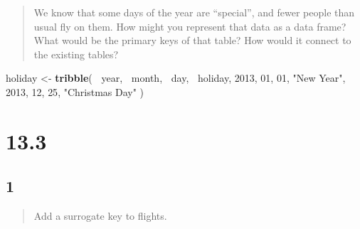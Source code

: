 \documentclass[]{ltjsarticle}
\newenvironment{Shaded}{\begin{snugshade}}{\end{snugshade}}
\newcommand{\DataTypeTok}[1]{\textcolor[rgb]{0.13,0.29,0.53}{#1}}
\newcommand{\DecValTok}[1]{\textcolor[rgb]{0.00,0.00,0.81}{#1}}
\newcommand{\KeywordTok}[1]{\textcolor[rgb]{0.13,0.29,0.53}{\textbf{#1}}}
\newcommand{\NormalTok}[1]{#1}
\newcommand{\OperatorTok}[1]{\textcolor[rgb]{0.81,0.36,0.00}{\textbf{#1}}}
\newcommand{\StringTok}[1]{\textcolor[rgb]{0.31,0.60,0.02}{#1}}
\begin{document}
\begin{quote}
We know that some days of the year are ``special'', and fewer people
than usual fly on them. How might you represent that data as a data
frame? What would be the primary keys of that table? How would it
connect to the existing tables?
\end{quote}

\begin{Shaded}
\begin{Highlighting}[]
\NormalTok{holiday <-}\StringTok{ }\KeywordTok{tribble}\NormalTok{(}
    \OperatorTok{~}\NormalTok{year, }\OperatorTok{~}\NormalTok{month, }\OperatorTok{~}\NormalTok{day, }\OperatorTok{~}\NormalTok{holiday,}
    \DecValTok{2013}\NormalTok{, }\DecValTok{01}\NormalTok{, }\DecValTok{01}\NormalTok{, }\StringTok{"New Year"}\NormalTok{,}
    \DecValTok{2013}\NormalTok{, }\DecValTok{12}\NormalTok{, }\DecValTok{25}\NormalTok{, }\StringTok{"Christmas Day"}
\NormalTok{)}
\end{Highlighting}
\end{Shaded}

\hypertarget{section-5}{%
\section{13.3}\label{section-5}}

\hypertarget{section-6}{%
\subsection{1}\label{section-6}}

\begin{quote}
Add a surrogate key to flights.
\end{quote}

\begin{Shaded}
\end{Shaded}
\end{document}
